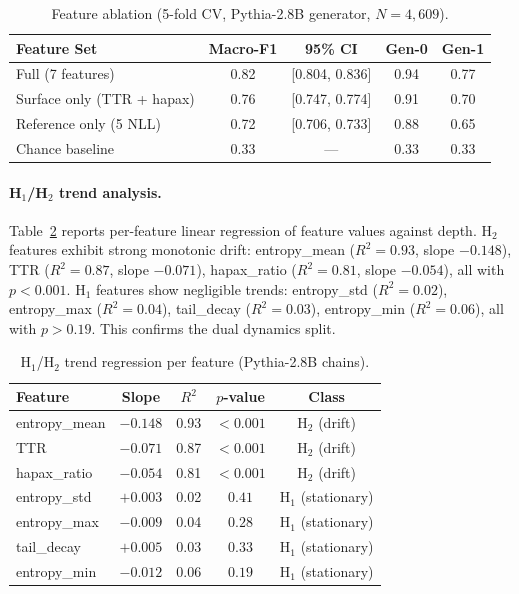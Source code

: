 \documentclass[letterpaper]{article}
\begin{document}
\begin{table}[h]
\centering
\caption{Feature ablation (5-fold CV, Pythia-2.8B generator, $N{=}4{,}609$).}
\label{tab:ablation}
\begin{tabular}{lcccc}
\toprule
Feature Set & Macro-F1 & 95\% CI & Gen-0 & Gen-1 \\
\midrule
Full (7 features) & 0.82 & [0.804, 0.836] & 0.94 & 0.77 \\
Surface only (TTR + hapax) & 0.76 & [0.747, 0.774] & 0.91 & 0.70 \\
Reference only (5 NLL) & 0.72 & [0.706, 0.733] & 0.88 & 0.65 \\
Chance baseline & 0.33 & --- & 0.33 & 0.33 \\
\bottomrule
\end{tabular}
\end{table}

\paragraph{H$_1$/H$_2$ trend analysis.}
Table~\ref{tab:trends} reports per-feature linear regression of feature values against depth.
H$_2$ features exhibit strong monotonic drift: entropy\_mean ($R^2{=}0.93$, slope $-0.148$), TTR ($R^2{=}0.87$, slope $-0.071$), hapax\_ratio ($R^2{=}0.81$, slope $-0.054$), all with $p{<}0.001$.
H$_1$ features show negligible trends: entropy\_std ($R^2{=}0.02$), entropy\_max ($R^2{=}0.04$), tail\_decay ($R^2{=}0.03$), entropy\_min ($R^2{=}0.06$), all with $p{>}0.19$.
This confirms the dual dynamics split.

\begin{table}[h]
\centering
\caption{H$_1$/H$_2$ trend regression per feature (Pythia-2.8B chains).}
\label{tab:trends}
\begin{tabular}{lcccc}
\toprule
Feature & Slope & $R^2$ & $p$-value & Class \\
\midrule
entropy\_mean & $-0.148$ & 0.93 & ${<}0.001$ & H$_2$ (drift) \\
TTR & $-0.071$ & 0.87 & ${<}0.001$ & H$_2$ (drift) \\
hapax\_ratio & $-0.054$ & 0.81 & ${<}0.001$ & H$_2$ (drift) \\
\midrule
entropy\_std & $+0.003$ & 0.02 & $0.41$ & H$_1$ (stationary) \\
entropy\_max & $-0.009$ & 0.04 & $0.28$ & H$_1$ (stationary) \\
tail\_decay & $+0.005$ & 0.03 & $0.33$ & H$_1$ (stationary) \\
entropy\_min & $-0.012$ & 0.06 & $0.19$ & H$_1$ (stationary) \\
\bottomrule
\end{tabular}
\end{table}
\end{document}

